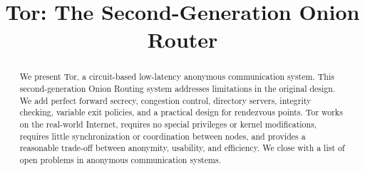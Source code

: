 \documentclass[times,10pt,twocolumn]{article}
\begin{document}

\title{Tor: The Second-Generation Onion Router}


\maketitle
\thispagestyle{empty}

\begin{abstract}
We present Tor, a circuit-based low-latency anonymous communication
system. This second-generation Onion Routing system addresses limitations
in the original design. We add perfect forward secrecy, congestion
control, directory servers, integrity checking, variable exit policies,
and a practical design for rendezvous points. Tor works on the real-world
Internet, requires no special privileges or kernel modifications, requires
little synchronization or coordination between nodes, and provides a
reasonable trade-off between anonymity, usability, and efficiency. We
close with a list of open problems in anonymous communication systems.
\end{abstract}



\label{sec:intro}
\end{document}

